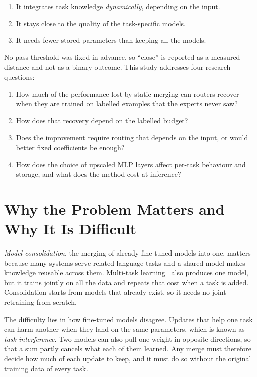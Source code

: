 \begin{enumerate}
  \item[\textbf{O1.}] It integrates task knowledge \emph{dynamically}, depending on the input.
  \item[\textbf{O2.}] It stays close to the quality of the task-specific models.
  \item[\textbf{O3.}] It needs fewer stored parameters than keeping all the models.
\end{enumerate}

No pass threshold was fixed in advance, so ``close'' is reported as a measured distance and not as a binary outcome. This study addresses four research questions:

\begin{enumerate}
  \item[\textbf{RQ1.}] How much of the performance lost by static merging can routers recover when they are trained on labelled examples that the experts never saw?
  \item[\textbf{RQ2.}] How does that recovery depend on the labelled budget?
  \item[\textbf{RQ3.}] Does the improvement require routing that depends on the input, or would better fixed coefficients be enough?
  \item[\textbf{RQ4.}] How does the choice of upscaled MLP layers affect per-task behaviour and storage, and what does the method cost at inference?
\end{enumerate}

\section{Why the Problem Matters and Why It Is Difficult}

\emph{Model consolidation}, the merging of already fine-tuned models into one, matters because many systems serve related language tasks and a shared model makes knowledge reusable across them. Multi-task learning~\cite{caruana1997multitask} also produces one model, but it trains jointly on all the data and repeats that cost when a task is added. Consolidation starts from models that already exist, so it needs no joint retraining from scratch.

The difficulty lies in how fine-tuned models disagree. Updates that help one task can harm another when they land on the same parameters, which is known as \emph{task interference}. Two models can also pull one weight in opposite directions, so that a sum partly cancels what each of them learned. Any merge must therefore decide how much of each update to keep, and it must do so without the original training data of every task.

